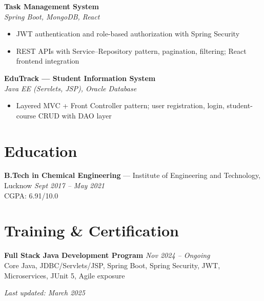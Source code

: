 \documentclass[10pt, letterpaper]{article}
\begin{document}
\vspace{2pt}
\textbf{Task Management System}\\
\small\textit{Spring Boot, MongoDB, React}
\begin{itemize}
    \item JWT authentication and role-based authorization with Spring Security
    \item REST APIs with Service--Repository pattern, pagination, filtering; React frontend integration
\end{itemize}

\vspace{2pt}
\textbf{EduTrack --- Student Information System}\\
\small\textit{Java EE (Servlets, JSP), Oracle Database}
\begin{itemize}
    \item Layered MVC + Front Controller pattern; user registration, login, student-course CRUD with DAO layer
\end{itemize}

\section*{Education}
\textbf{B.Tech in Chemical Engineering} --- Institute of Engineering and Technology, Lucknow \hfill \textit{Sept 2017 -- May 2021}\\
CGPA: 6.91/10.0

\section*{Training \& Certification}
\textbf{Full Stack Java Development Program} \hfill \textit{Nov 2024 -- Ongoing}\\
Core Java, JDBC/Servlets/JSP, Spring Boot, Spring Security, JWT, Microservices, JUnit 5, Agile exposure

\vspace{4pt}
\raggedleft \small \textit{Last updated: March 2025}
\end{document}
